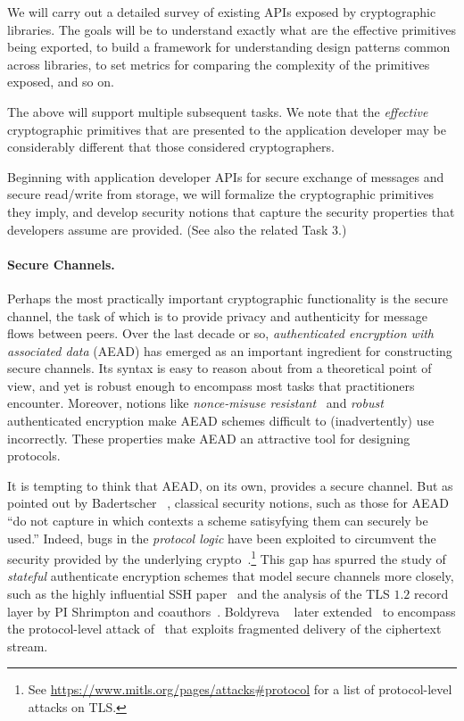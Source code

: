 \begin{task}
  We will carry out a detailed survey of existing APIs exposed by
  cryptographic libraries. The goals will be to understand exactly
  what are the effective primitives being exported, to build a
  framework for understanding design patterns common across libraries,
  to set metrics for comparing the complexity of the primitives
  exposed, and so on.
\end{task}
\noindent
The above will support multiple subsequent tasks.  We note that the
\emph{effective} cryptographic primitives that are presented to the application
developer may be considerably different that those considered cryptographers.

\begin{task}
Beginning with application developer APIs for secure exchange of messages
and secure read/write from storage, we will formalize the
cryptographic primitives they imply, and develop security notions that
capture the security properties that developers assume are provided.
(See also the related Task 3.)
\end{task}



\paragraph{Secure Channels. }
Perhaps the most practically important cryptographic functionality is the
secure channel, the task of which is to provide privacy and authenticity for
message flows between peers.
%
Over the last decade or so, \emph{authenticated encryption with associated data}
(AEAD) has emerged as an important ingredient for constructing secure channels.
%
Its syntax is easy to reason about from a theoretical point of view, and yet is
robust enough to encompass most tasks that practitioners encounter. Moreover,
notions like \emph{nonce-misuse resistant}~\cite{RS06} and
\emph{robust}~\cite{HKR15} authenticated encryption make AEAD schemes difficult
to (inadvertently) use incorrectly. These properties make AEAD an attractive
tool for designing protocols.

It is tempting to think that AEAD, on its own, provides a secure channel.  But
as pointed out by Badertscher \etal~\cite{BMM+15}, classical security
notions, such as those for AEAD ``do not capture in which contexts a scheme
satisyfying them can securely be used.''  Indeed, bugs in the
\emph{protocol logic} have been exploited to circumvent the
security provided by the underlying
crypto~\cite{Vau02,BKN02,APW09}.\footnote{See
\url{https://www.mitls.org/pages/attacks\#protocol} for a list of
protocol-level attacks on TLS.}  This gap has spurred the study of
\emph{stateful} authenticate encryption schemes that model secure channels more
closely, such as the highly influential SSH paper~\cite{BKN02} and the analysis
of the TLS $1.2$ record layer by PI Shrimpton and coauthors~\cite{PRS11}. Boldyreva
\etal~\cite{BDPS12} later extended~\cite{BKN02} to encompass the protocol-level
attack of~\cite{APW09} that exploits fragmented delivery of the
ciphertext stream. 

